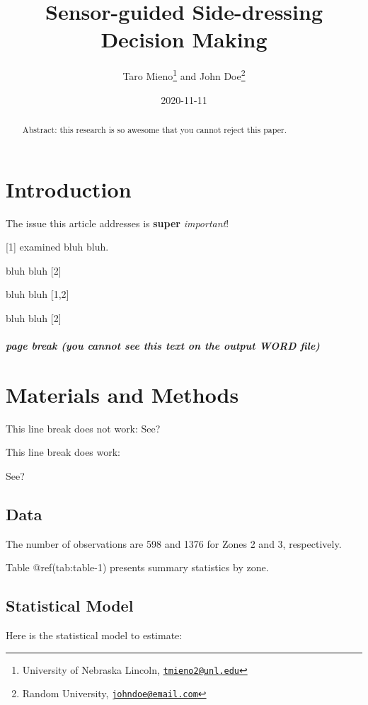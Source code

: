 \documentclass[
]{article}
\title{Sensor-guided Side-dressing Decision Making}
\author{Taro Mieno\footnote{University of Nebraska Lincoln,
  \href{mailto:tmieno2@unl.edu}{\nolinkurl{tmieno2@unl.edu}}} and John
Doe\footnote{Random University,
  \href{mailto:johndoe@email.com}{\nolinkurl{johndoe@email.com}}}}
\date{2020-11-11}
\begin{document}
\maketitle
\begin{abstract}
Abstract: this research is so awesome that you cannot reject this paper.
\end{abstract}

\hypertarget{introduction}{%
\section{Introduction}\label{introduction}}

The issue this article addresses is \textbf{super} \emph{important}!

{[}1{]} examined bluh bluh.

bluh bluh {[}2{]}

bluh bluh {[}1,2{]}

bluh bluh {[}2{]}

\hypertarget{page-break-you-cannot-see-this-text-on-the-output-word-file}{%
\subparagraph{page break (you cannot see this text on the output WORD
file)}\label{page-break-you-cannot-see-this-text-on-the-output-word-file}}

\hypertarget{materials-and-methods}{%
\section{Materials and Methods}\label{materials-and-methods}}

This line break does not work: See?

This line break does work:

See?

\hypertarget{data}{%
\subsection{Data}\label{data}}

The number of observations are 598 and 1376 for Zones 2 and 3,
respectively.

Table @ref(tab:table-1) presents summary statistics by zone.

\hypertarget{statistical-model}{%
\subsection{Statistical Model}\label{statistical-model}}

Here is the statistical model to estimate:
\end{document}
